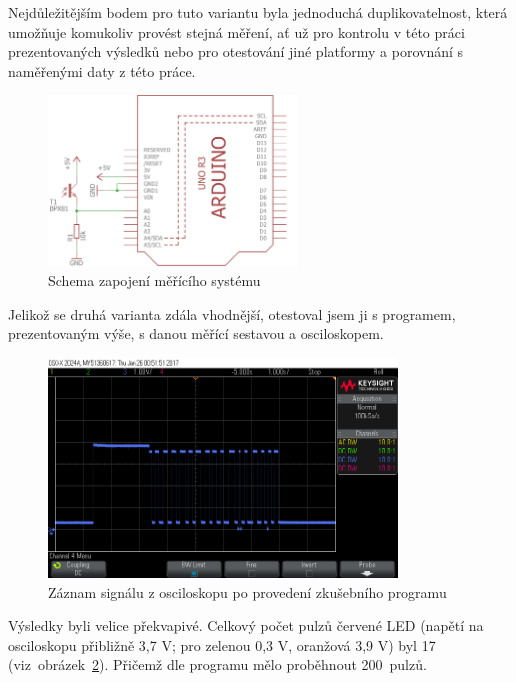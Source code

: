 Nejdůležitějším bodem pro tuto variantu byla jednoduchá duplikovatelnost, která umožňuje komukoliv provést stejná měření, ať už pro kontrolu v této práci prezentovaných výsledků nebo pro otestování jiné platformy a porovnání s naměřenými daty z této práce.

\begin{figure}[h]
	\centering
	\includegraphics[width=250px]{images/measuring-arduino-system_schema.png}	
	\caption[Schema zapojení měřícího systému]{Schema zapojení měřícího systému}
	\label{fig:arduino-measuring-system}
\end{figure}

Jelikož se druhá varianta zdála vhodnější, otestoval jsem ji s programem, prezentovaným výše, s danou měřící sestavou a osciloskopem. 

\begin{figure}[h]
	\centering
	\includegraphics[width=350px]{images/measuring-oscilloscope_ev3-software_led-blinking_all.png}
	\caption[Záznam signálu z osciloskopu po provedení zkušebního programu]{Záznam signálu z osciloskopu po provedení zkušebního programu}
	\label{fig:measuring_lego-ev3_orig-soft_led-blinking_all}
\end{figure}

Výsledky byli velice překvapivé. Celkový počet pulzů červené LED (napětí na osciloskopu přibližně 3,7 V; pro zelenou 0,3 V, oranžová 3,9 V) byl 17 
(viz~obrázek~\ref{fig:measuring_lego-ev3_orig-soft_led-blinking_all}). Přičemž dle programu mělo proběhnout 200~pulzů.  

